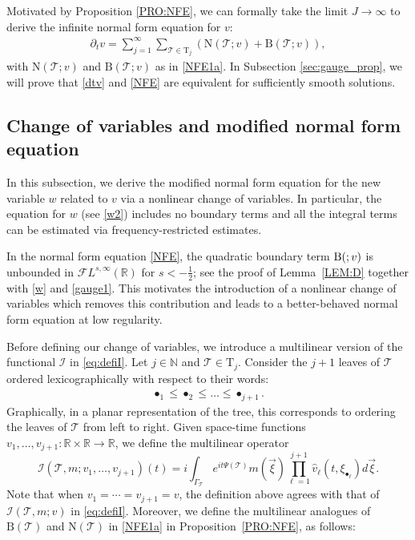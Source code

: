 \documentclass[a4paper,
11pt,  reqno]{amsart}
\makeatletter
\newcommand{\5}{\textup{V}}
\newcommand{\FL}{\mathcal{F} L}
\newcommand{\ft}{\widehat}
\newcommand{\dt}{\partial_t}
\theoremstyle{remark}
\newcommand{\R}{\mathbb{R}}
\newcommand{\bul}{\bullet}
\newcommand{\TT}{\mathcal{T}}
\newcommand{\Tr}{\mathrm{T}}
\renewcommand{\l}{\ell}
\newcommand{\N}{\mathbb{N}}
\def\<#1>{\csname MH@symb@#1\endcsname}
\newcommand{\Ical}{\mathcal{I}}
\numberwithin{equation}{section}
\numberwithin{theorem}{section}
\newcommand{\NN}{\mathrm{N}}
\newcommand{\BB}{\mathrm{B}}
\makeatother
\begin{document}
Motivated by Proposition \ref{PRO:NFE}, we can formally take the limit $J\to \infty$ to derive the infinite normal form equation for $v$:
\begin{align}
\label{NFE}
\dt v= \sum_{j=1}^{\infty} \sum_{\TT\in \Tr_j} \left(\NN(\TT;v) +
\BB(\TT;v) \right)
,
\end{align}
with $\NN(\TT;v)$ and $\BB(\TT;v)$ as in \eqref{NFE1a}. 
In Subsection \ref{sec:gauge_prop}, we will prove that \eqref{dtv} and \eqref{NFE} are equivalent for sufficiently smooth solutions.

\subsection{Change of variables and modified normal form equation}
\label{SUBSEC:gauge}

In this subsection, we derive the modified normal form equation for the new variable $w$ related to $v$ via a nonlinear change of variables. In particular, the equation for $w$ (see \eqref{w2}) includes no boundary terms and all the integral terms can be estimated via frequency-restricted estimates.



In the normal form equation \eqref{NFE}, the quadratic boundary term $\BB(\<1>;v)$ is unbounded in $\FL^{s,\infty}(\R)$ for $s<-\frac12$; see the proof of Lemma~\ref{LEM:D} together with \eqref{w} and \eqref{gauge1}. This motivates the introduction of a nonlinear change of variables which removes this contribution and leads to a better-behaved normal form equation at low regularity.

Before defining our change of variables, we introduce a multilinear version of the functional $\Ical$ in \eqref{eq:defiI}.
Let $j\in \N$ and $\TT\in \Tr_j$. Consider the $j+1$ leaves of $\TT$ ordered lexicographically with respect to their words:
\begin{align}
\label{lexic}
\bul_1\le \bul_2\le \dots \le \bul_{j+1}.
\end{align}
Graphically, in a
planar representation of the tree, this corresponds to ordering the leaves of
$\TT$ from left to right. Given space-time functions $v_1,\dots, v_{j+1}: \R \times \R \to \R$, we
define the multilinear operator
\begin{equation}\label{eq:defiImulti}
\Ical(\TT, m; v_1,\dots,v_{j+1}) (t)=i
\int_{\Gamma_\TT}
e^{it\Psi(\TT)}m(\vec{\xi}) \prod_{\ell
=1}^{j+1} \ft v_\l (t,\xi_{\bul_\ell}) d\vec{\xi}
.
\end{equation}
Note that
when $v_1 = \cdots = v_{j+1} = v$, the definition above agrees with that of $\Ical(\TT, m; v )$ in \eqref{eq:defiI}.  Moreover, we define the multilinear analogues of $\BB(\TT)$ and $\NN(\TT)$ in \eqref{NFE1a} in Proposition~\ref{PRO:NFE}, as follows:
\end{document}
